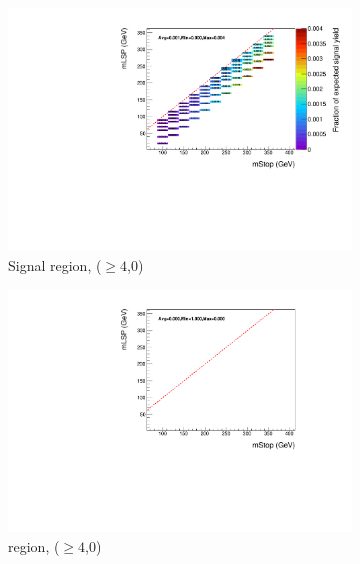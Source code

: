 \begin{figure}[ht!]
  \begin{subfigure}[b]{0.47\textwidth}
    \includegraphics[width=\textwidth]{Figs/sms/t2cc/v37/effs/T2cc_had_eff_maps_eq0b_ge4j_SITV.pdf}
    \caption{Signal region, ($\geq 4$,0)}
    \label{fig:t2cc_sig_eff_ge4j_0b}
  \end{subfigure}
  \begin{subfigure}[b]{0.47\textwidth}
    \includegraphics[width=\textwidth]{Figs/sms/t2cc/v37/effs/T2cc_muon_eff_maps_eq0b_ge4j_SITV.pdf}
    \caption{\mj region, ($\geq 4$,0)}
    \label{fig:t2cc_mu_eff_ge4j_0b}
  \end{subfigure} \\
  \begin{subfigure}[b]{0.47\textwidth}

\end{subfigure}
\end{figure}
